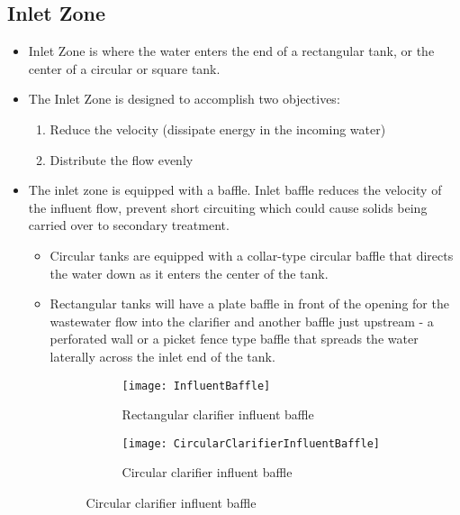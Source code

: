 \subsection{Inlet Zone}		
				\begin{itemize}
					\item Inlet Zone is where the water enters the end 					of a rectangular tank, or the center of a circular 					or square tank.
					\item The Inlet Zone is designed to accomplish two 					objectives:
						\begin{enumerate}
							\item Reduce the velocity (dissipate 									energy in the incoming water)
							\item Distribute the flow evenly
						\end{enumerate}
					\item The inlet zone is equipped with a baffle.  					Inlet baffle reduces the velocity of the 							influent flow, prevent short circuiting which 							could cause solids being carried over to secondary 					treatment.  
						\begin{itemize}
							\item Circular tanks are equipped with a 								collar-type circular baffle that directs 								the water down as it enters the center of 								the tank.
							\item Rectangular tanks will have a plate 								baffle in front of the opening for the 									wastewater flow into the clarifier and 									another baffle just upstream - a 										perforated wall or a picket fence type 									baffle that spreads the water laterally 								across the inlet end of the tank.\\

\begin{figure}[h!]
  \centering
  \begin{subfigure}[b]{0.4\linewidth}
    \texttt{[image: InfluentBaffle]}
    \caption{Rectangular clarifier influent baffle}
  \end{subfigure}
  \hspace{1cm}
  \begin{subfigure}[b]{0.4\linewidth}
    \texttt{[image: CircularClarifierInfluentBaffle]}
    \caption{Circular clarifier influent baffle}
  \end{subfigure}
\end{figure}	
	
%							
						\end{itemize}
				\end{itemize}


